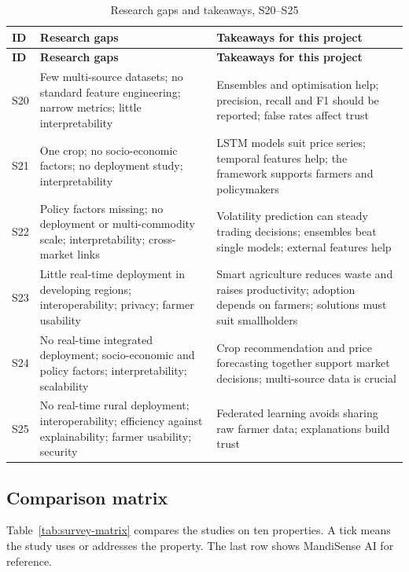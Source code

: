 {\footnotesize\setlength{\tabcolsep}{4pt}\renewcommand{\arraystretch}{1.15}
\begin{longtable}{|p{0.9cm}|p{6.4cm}|p{8.6cm}|}
\caption{Research gaps and takeaways, S20--S25}\label{tab:survey-g3}\\
\hline \textbf{ID} & \textbf{Research gaps} & \textbf{Takeaways for this project} \\ \hline \endfirsthead
\hline \textbf{ID} & \textbf{Research gaps} & \textbf{Takeaways for this project} \\ \hline \endhead
\hline \endfoot
S20 & Few multi-source datasets; no standard feature engineering; narrow metrics; little interpretability & Ensembles and optimisation help; precision, recall and F1 should be reported; false rates affect trust \\ \hline
S21 & One crop; no socio-economic factors; no deployment study; interpretability & LSTM models suit price series; temporal features help; the framework supports farmers and policymakers \\ \hline
S22 & Policy factors missing; no deployment or multi-commodity scale; interpretability; cross-market links & Volatility prediction can steady trading decisions; ensembles beat single models; external features help \\ \hline
S23 & Little real-time deployment in developing regions; interoperability; privacy; farmer usability & Smart agriculture reduces waste and raises productivity; adoption depends on farmers; solutions must suit smallholders \\ \hline
S24 & No real-time integrated deployment; socio-economic and policy factors; interpretability; scalability & Crop recommendation and price forecasting together support market decisions; multi-source data is crucial \\ \hline
S25 & No real-time rural deployment; interoperability; efficiency against explainability; farmer usability; security & Federated learning avoids sharing raw farmer data; explanations build trust \\ \hline
\end{longtable}}

\subsection{Comparison matrix}
Table~\ref{tab:survey-matrix} compares the studies on ten properties. A tick means the study uses or addresses the property. The last row shows MandiSense AI for reference.

